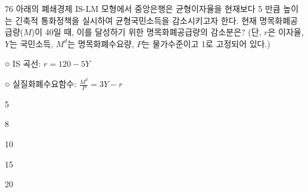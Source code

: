 \begin{question}{76}
아래의 폐쇄경제 IS-LM 모형에서 중앙은행은 균형이자율을 현재보다 5 만큼 높이는 긴축적 통화정책을 실시하여 균형국민소득을 감소시키고자 한다. 현재 명목화폐공급량($M$)이 40일 때, 이를 달성하기 위한 명목화폐공급량의 감소분은? (단, $r$은 이자율, $Y$는 국민소득, $M^{d}$는 명목화폐수요량, $P$는 물가수준이고 1로 고정되어 있다.)
\begin{framedtext}
○ IS 곡선: $r=120-5Y$ \par
○ 실질화폐수요함수: $\frac{M^{d}}{P}=3Y-r$ \par
\end{framedtext}
\begin{choices}
  \item 5
  \item 8
  \item 10
  \item 15
  \item 20
\end{choices}
\end{question}
